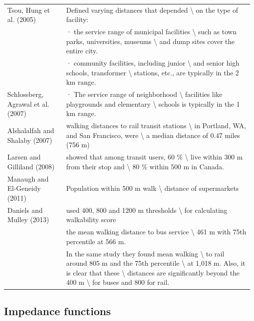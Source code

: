 \documentclass[
11pt, %
oneside, %
english, %
singlespacing, %
]{macthesis} %
\begin{document}
\begin{landscape}
\begin{longtable}[t]{>{\raggedright\arraybackslash}p{9cm}>{\raggedright\arraybackslash}p{9cm}}
Tsou, Hung et al. (2005) & Defined varying distances that depended \textbackslash{} on the type of facility:\\
 & · the service range of municipal facilities \textbackslash{} such as town parks, universities, museums \textbackslash{} and dump sites cover the entire city.\\
 & · community facilities, including junior \textbackslash{} and senior high schools, transformer \textbackslash{} stations, etc., are typically in the 2 km range.\\
\addlinespace
Schlossberg, Agrawal et al. (2007) & · The service range of neighborhood \textbackslash{} facilities like playgrounds and elementary \textbackslash{} schools is typically in the 1 km range.\\
Alshalalfah and Shalaby (2007) & walking distances to rail transit stations \textbackslash{} in Portland, WA, and San Francisco, were \textbackslash{} a median distance of 0.47 miles (756 m)\\
Larsen and Gilliland (2008) & showed that among transit users, 60 \% \textbackslash{} live within 300 m from their stop and \textbackslash{} 80 \% within 500 m in Canada.\\
Manaugh and El-Geneidy (2011) & Population within 500 m walk \textbackslash{} distance of supermarkets\\
Daniels and Mulley (2013) & used 400, 800 and 1200 m thresholds \textbackslash{} for calculating walkability score\\
\addlinespace
 & the mean walking distance to bus service \textbackslash{} 461 m with 75th percentile at 566 m.\\
 & In the same study they found mean walking \textbackslash{} to rail around 805 m and the 75th percentile \textbackslash{} at 1,018 m. Also, it is clear that these \textbackslash{} distances are significantly beyond the 400 m \textbackslash{} for buses and 800 for rail.\\
\bottomrule
\end{longtable}
\endgroup{}
\end{landscape}

\subsection{Impedance functions}\label{impedance-functions}
\end{document}
